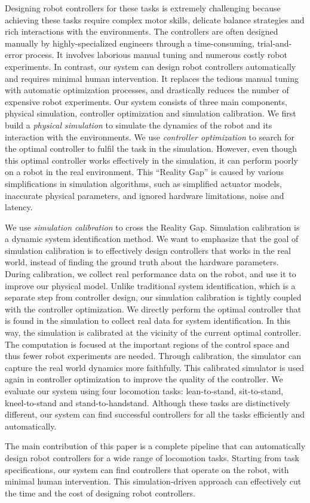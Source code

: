 Designing robot controllers for these tasks is extremely challenging because achieving these tasks require complex motor skills, delicate balance strategies and rich interactions with the environments. The controllers are often designed manually by highly-specialized engineers through a time-consuming, trial-and-error process. It involves laborious manual tuning and numerous costly robot experiments. In contrast, our system can design robot controllers automatically and requires minimal human intervention. It replaces the tedious manual tuning with automatic optimization processes, and drastically reduces the number of expensive robot experiments. Our system consists of three main components, physical simulation, controller optimization and simulation calibration. We first build a \emph{physical simulation} to simulate the dynamics of the robot and its interaction with the environments. We use \emph{controller optimization} to search for the optimal controller to fulfil the task in the simulation. However, even though this optimal controller works effectively in the simulation, it can perform poorly on a robot in the real environment. This ``Reality Gap'' \cite{Jakobi95} is caused by various simplifications in simulation algorithms, such as simplified actuator models, inaccurate physical parameters, and ignored hardware limitations, noise and latency. 


We use \emph{simulation calibration} to cross the Reality Gap. Simulation calibration is a dynamic system identification method. We want to emphasize that the goal of simulation calibration is to effectively design controllers that works in the real world, instead of finding the ground truth about the hardware parameters. During calibration, we collect real performance data on the robot, and use it to improve our physical model. Unlike traditional system identification, which is a separate step from controller design, our simulation calibration is tightly coupled with the controller optimization. We directly perform the optimal controller that is found in the simulation to collect real data for system identification. In this way, the simulation is calibrated at the vicinity of the current optimal controller. The computation is focused at the important regions of the control space and thus fewer robot experiments are needed. Through calibration, the simulator can capture the real world dynamics more faithfully. This calibrated simulator is used again in controller optimization to improve the quality of the controller. We evaluate our system using four locomotion tasks: lean-to-stand, sit-to-stand, kneel-to-stand and stand-to-handstand. Although these tasks are distinctively different, our system can find successful controllers for all the tasks efficiently and automatically. 

The main contribution of this paper is a complete pipeline that can automatically design robot controllers for a wide range of locomotion tasks. Starting from task specifications, our system can find controllers that operate on the robot, with minimal human intervention. This simulation-driven approach can effectively cut the time and the cost of designing robot controllers. 
